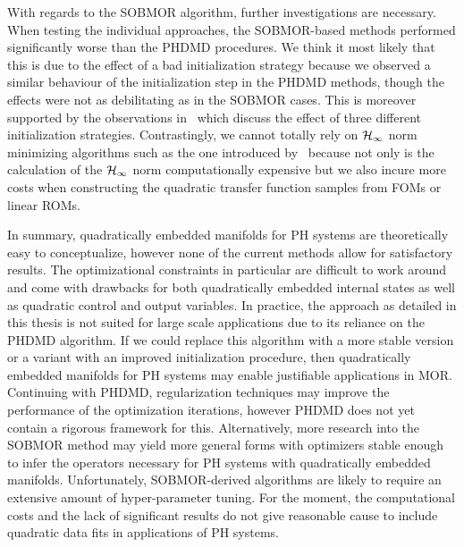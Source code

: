 With regards to the \ac{SOBMOR} algorithm, further investigations are necessary.
When testing the individual approaches, the \ac{SOBMOR}-based methods performed significantly worse than the \ac{PHDMD} procedures.
We think it most likely that this is due to the effect of a bad initialization strategy because we observed a similar behaviour of the initialization step in the \ac{PHDMD} methods, though the effects were not as debilitating as in the \ac{SOBMOR} cases.
This is moreover supported by the observations in~\cite[Section~4.1]{SV2023} which discuss the effect of three different initialization strategies.
Contrastingly, we cannot totally rely on $\mathcal{H}_\infty$ norm minimizing algorithms such as the one introduced by~\cite{Beddig2019} because not only is the calculation of the $\mathcal{H}_\infty$ norm computationally expensive but we also incure more costs when constructing the quadratic transfer function samples from \acp{FOM} or linear \acp{ROM}.



In summary, quadratically embedded manifolds for \ac{PH} systems are theoretically easy to conceptualize, however none of the current methods allow for satisfactory results.
The optimizational constraints in particular are difficult to work around and come with drawbacks for both quadratically embedded internal states as well as quadratic control and output variables.
In practice, the approach as detailed in this thesis is not suited for large scale applications due to its reliance on the \ac{PHDMD} algorithm.
If we could replace this algorithm with a more stable version or a variant with an improved initialization procedure, then quadratically embedded manifolds for \ac{PH} systems may enable justifiable applications in \ac{MOR}.
Continuing with \ac{PHDMD}, regularization techniques may improve the performance of the optimization iterations, however \ac{PHDMD} does not yet contain a rigorous framework for this.
Alternatively, more research into the \ac{SOBMOR} method may yield more general forms with optimizers stable enough to infer the operators necessary for \ac{PH} systems with quadratically embedded manifolds.
Unfortunately, \ac{SOBMOR}-derived algorithms are likely to require an extensive amount of hyper-parameter tuning.
For the moment, the computational costs and the lack of significant results do not give reasonable cause to include quadratic data fits in applications of \ac{PH} systems.
